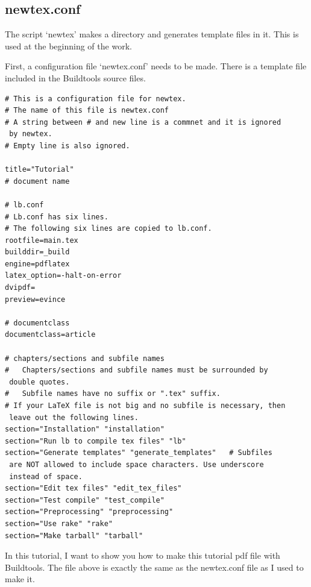 \subsection{newtex.conf}
The script `newtex' makes a directory and generates template files in it.
This is used at the beginning of the work.

First, a configuration file `newtex.conf' needs to be made.
There is a template file included in the Buildtools source files.
\begin{verbatim}
# This is a configuration file for newtex.
# The name of this file is newtex.conf
# A string between # and new line is a commnet and it is ignored
 by newtex.
# Empty line is also ignored. 

title="Tutorial"
# document name

# lb.conf
# Lb.conf has six lines.
# The following six lines are copied to lb.conf.
rootfile=main.tex
builddir=_build
engine=pdflatex
latex_option=-halt-on-error
dvipdf=
preview=evince

# documentclass
documentclass=article

# chapters/sections and subfile names
#   Chapters/sections and subfile names must be surrounded by
 double quotes.
#   Subfile names have no suffix or ".tex" suffix.
# If your LaTeX file is not big and no subfile is necessary, then
 leave out the following lines.
section="Installation" "installation"
section="Run lb to compile tex files" "lb"
section="Generate templates" "generate_templates"   # Subfiles
 are NOT allowed to include space characters. Use underscore
 instead of space. 
section="Edit tex files" "edit_tex_files"
section="Test compile" "test_compile"
section="Preprocessing" "preprocessing"
section="Use rake" "rake"
section="Make tarball" "tarball"

\end{verbatim}
In this tutorial, I want to show you how to make this tutorial pdf file with Buildtools.
The file above is exactly the same as the newtex.conf file as I used to make it.

